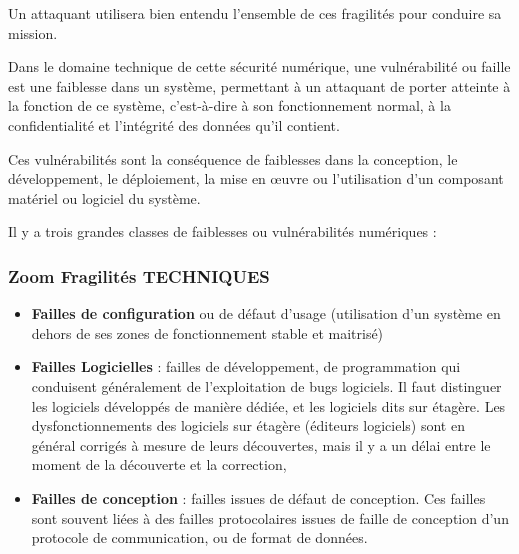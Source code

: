 Un attaquant utilisera bien entendu l’ensemble de ces fragilités pour conduire sa mission.

Dans le domaine technique de cette sécurité numérique, une vulnérabilité ou faille est une faiblesse dans un système, permettant à un attaquant de porter atteinte à la fonction de ce système, c'est-à-dire à son fonctionnement normal, à la confidentialité et l'intégrité des données qu'il contient.

Ces vulnérabilités sont la conséquence de faiblesses dans la conception, le développement, le déploiement, la mise en œuvre ou l'utilisation d'un composant matériel ou logiciel du système. 

Il y a trois grandes classes de faiblesses ou vulnérabilités numériques :

\begin{frame}
\frametitle<presentation>{Zoom Fragilités TECHNIQUES}
\begin{itemize}
\item \textbf{Failles de configuration} ou de défaut d’usage (utilisation d’un système en dehors de ses zones de fonctionnement stable et maitrisé)
\item \textbf{Failles Logicielles } : failles de développement, de programmation qui conduisent généralement de l'exploitation de bugs logiciels. Il faut distinguer les logiciels développés de manière dédiée, et les logiciels dits sur étagère.
Les dysfonctionnements des logiciels sur étagère (éditeurs logiciels) sont en général corrigés à mesure de leurs découvertes, mais il y a un délai entre le moment de la découverte et la correction,
\item \textbf{Failles de conception} : failles issues de défaut de conception. Ces failles sont souvent liées à des failles protocolaires issues de faille de conception d'un protocole de communication, ou de format de données.
\end{itemize}
\end{frame}


